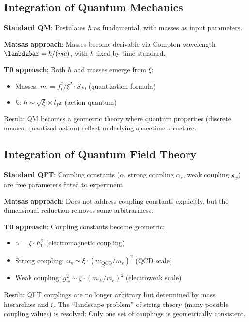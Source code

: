 	\subsection{Integration of Quantum Mechanics}
	
	\textbf{Standard QM}: Postulates $\hbar$ as fundamental, with masses as input parameters.
	
	\textbf{Matsas approach}: Masses become derivable via Compton wavelength $\lambdabar = \hbar/(mc)$, with $\hbar$ fixed by time standard.
	
	\textbf{T0 approach}: Both $\hbar$ and masses emerge from $\xi$:
	\begin{itemize}
		\item Masses: $m_i = f_i^2 / \xi^2 \cdot S_{T0}$ (quantization formula)
		\item $\hbar$: $\hbar \sim \sqrt{\xi} \times l_P c$ (action quantum)
	\end{itemize}
	
	Result: QM becomes a geometric theory where quantum properties (discrete masses, quantized action) reflect underlying spacetime structure.
	
	\subsection{Integration of Quantum Field Theory}
	
	\textbf{Standard QFT}: Coupling constants ($\alpha$, strong coupling $\alpha_s$, weak coupling $g_w$) are free parameters fitted to experiment.
	
	\textbf{Matsas approach}: Does not address coupling constants explicitly, but the dimensional reduction removes some arbitrariness.
	
	\textbf{T0 approach}: Coupling constants become geometric:
	\begin{itemize}
		\item $\alpha = \xi \cdot E_0^2$ (electromagnetic coupling)
		\item Strong coupling: $\alpha_s \sim \xi \cdot (m_{\text{QCD}}/m_e)^2$ (QCD scale)
		\item Weak coupling: $g_w^2 \sim \xi \cdot (m_W/m_e)^2$ (electroweak scale)
	\end{itemize}
	
	Result: QFT couplings are no longer arbitrary but determined by mass hierarchies and $\xi$. The ``landscape problem'' of string theory (many possible coupling values) is resolved: Only one set of couplings is geometrically consistent.
	
